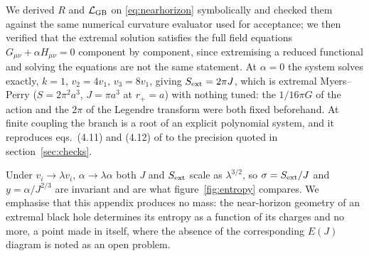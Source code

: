 \documentclass[11pt,a4paper]{article}
\begin{document}
We derived $R$ and $\mathcal{L}_{\mathrm{GB}}$ on \eqref{eq:nearhorizon} symbolically and
checked them against the same numerical curvature evaluator used for acceptance;
we then verified that the extremal solution satisfies the full field equations
$G_{\mu\nu}+\alpha H_{\mu\nu}=0$ component by component, since extremising a
reduced functional and solving the equations are not the same statement. At
$\alpha=0$ the system solves exactly, $k=1$, $v_{2}=4v_{1}$, $v_{3}=8v_{1}$,
giving $S_{\mathrm{ext}} = 2\pi J$, which is extremal Myers--Perry
($S=2\pi^{2}a^{3}$, $J=\pi a^{3}$ at $r_{+}=a$) with nothing tuned: the
$1/16\pi G$ of the action and the $2\pi$ of the Legendre transform were both
fixed beforehand. At finite coupling the branch is a root of an explicit
polynomial system, and it reproduces eqs.~(4.11) and (4.12) of
\cite{Brihaye:2010wp} to the precision quoted in section~\ref{sec:checks}.

Under $v_{i}\to\lambda v_{i}$, $\alpha\to\lambda\alpha$ both $J$ and $S_{\mathrm{ext}}$
scale as $\lambda^{3/2}$, so $\sigma=S_{\mathrm{ext}}/J$ and $y=\alpha/J^{2/3}$ are
invariant and are what figure~\ref{fig:entropy} compares. We emphasise that this
appendix produces no mass: the near-horizon geometry of an extremal black hole
determines its entropy as a function of its charges and no more, a point made in
\cite{Brihaye:2010wp} itself, where the absence of the corresponding $E(J)$
diagram is noted as an open problem.
\end{document}
